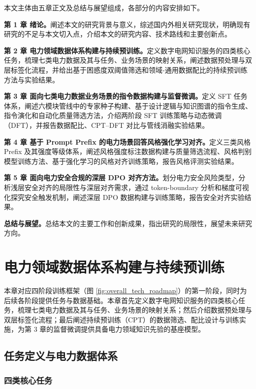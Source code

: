 \documentclass[fontset=fandol,type=master,campus=shenzhen,etitleauto=true]{hithesisbook}
\begin{document}
本文主体由五章正文及总结与展望组成，各部分的内容安排如下。

\textbf{第 1 章 绪论。}阐述本文的研究背景与意义，综述国内外相关研究现状，明确现有研究的不足与本文切入点，介绍本文的研究内容、技术路线和主要创新点。

\textbf{第 2 章 电力领域数据体系构建与持续预训练。}定义数字电网知识服务的四类核心任务，梳理七类电力数据及其与任务、业务场景的映射关系，阐述数据预处理与双层标签化流程，并给出基于困惑度双阈值筛选和领域-通用数据配比的持续预训练方法与实验结果。

\textbf{第 3 章 面向七类电力数据业务场景的指令数据构建与监督微调。}定义 SFT 任务体系，阐述六模块管线中的专家种子构建、基于设计逻辑与知识图谱的指令生成、指令演化和自动化质量筛选方法，介绍两阶段 SFT 训练策略与动态微调（DFT），并报告数据配比、CPT--DFT 对比与管线消融实验结果。

\textbf{第 4 章 基于 Prompt Prefix 的电力场景回答风格强化学习对齐。}定义三类风格 Prefix 及其强度等级体系，阐述风格强度标注数据构建与质量筛选流程、风格判别模型训练方法、基于强化学习的风格对齐训练策略，报告风格评测实验结果。

\textbf{第 5 章 面向电力安全合规的深层 DPO 对齐方法。}划分电力安全风险类型，分析浅层安全对齐的局限性与深层对齐需求，通过 token-boundary 分析和梯度可视化探究安全触发机制，阐述深层 DPO 数据构建与训练策略，报告安全对齐实验结果。

\textbf{总结与展望。}总结本文的主要工作和创新成果，指出研究的局限性，展望未来研究方向。


\chapter{电力领域数据体系构建与持续预训练}\label{ux9762ux5411ux7535ux529bux77e5ux8bc6ux670dux52a1ux7684ux5927ux8bedux8a00ux6a21ux578bux603bux4f53ux6846ux67b6}

本章对应四阶段训练框架（图 \ref{fig:overall_tech_roadmap}）的第一阶段，同时为后续各阶段提供任务与数据基础。本章首先定义数字电网知识服务的四类核心任务，梳理七类电力数据及其与任务、业务场景的映射关系；然后介绍数据预处理与双层标签化流程；最后阐述持续预训练（CPT）的数据筛选、配比设计与训练实施，为第 3 章的监督微调提供具备电力领域知识先验的基座模型。

\section{任务定义与电力数据体系}\label{sec:task-data}

\subsection{四类核心任务}\label{ux4efbux52a1ux5b9aux4e49}
\end{document}

